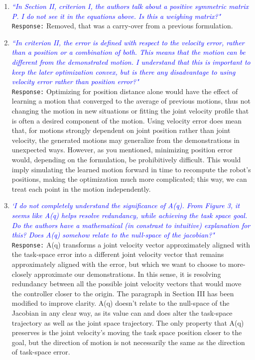 \documentclass{article}
\begin{document}
\begin{enumerate}
\item \textcolor{blue}{\textit{``In Section II, criterion I, the authors talk about a positive symmetric matrix P. I do not see it in the
equations above. Is this a weighing matrix?"}}\\
\texttt{Response:} \small Removed, that was a carry-over from a previous formulation.\\

\item \textcolor{blue}{\textit{``In criterion II, the error is defined with respect to the velocity error, rather than a position or a combination
of both. This means that the motion can be different from the demonstrated motion. I understand
that this is important to keep the later optimization convex, but is there any disadvantage to using
velocity error rather than position error?"}}\\
\texttt{Response:} \small Optimizing for position distance alone would have the effect of learning a motion that converged to the average of previous motions, thus not changing the motion in new situations or fitting the joint velocity profile that is often a desired component of the motion. Using velocity error does mean that, for motions strongly dependent on joint position rather than joint velocity, the generated motions may generalize from the demonstrations in unexpected ways. However, as you mentioned, minimizing position error would, depending on the formulation, be prohibitively difficult. This would imply simulating the learned motion forward in time to recompute the robot's positions, making the optimization much more complicated; this way, we can treat each point in the motion independently.\\

\item \textcolor{blue}{\textit{`I do not completely understand the significance of A(q). From Figure 3, it seems like A(q) helps resolve
redundancy, while achieving the task space goal. Do the authors have a mathematical (in constrast to
intuitive) explanation for this? Does A(q) somehow relate to the null-space of the jacobian?"}}\\
\texttt{Response:} \small A(q) transforms a joint velocity vector approximately aligned with the task-space error into a different joint velocity vector that remains approximately aligned with the error, but which we want to choose to more-closely approximate our demonstrations. In this sense, it is resolving redundancy between all the possible joint velocity vectors that would move the controller closer to the origin. The paragraph in Section III has been modified to improve clarity. A(q) doesn't relate to the null-space of the Jacobian in any clear way, as its value can and does alter the task-space trajectory as well as the joint space trajectory. The only property that A(q) preserves is the joint velocity's moving the task space position closer to the goal, but the direction of motion is not necessarily the same as the direction of task-space error.\\


\end{enumerate}
\end{document}
